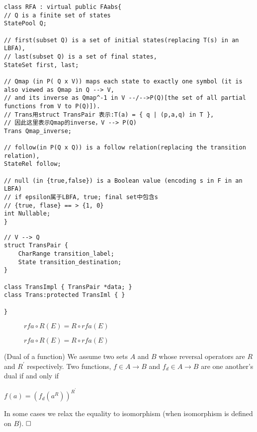 \begin{lstlisting}
class RFA : virtual public FAabs{
// Q is a finite set of states
StatePool Q;  
  
// first(subset Q) is a set of initial states(replacing T(s) in an LBFA),
// last(subset Q) is a set of final states,
StateSet first, last;

// Qmap (in P( Q x V)) maps each state to exactly one symbol (it is also viewed as Qmap in Q --> V, 
// and its inverse as Qmap^-1 in V --/-->P(Q)[the set of all partial functions from V to P(Q)]).
// Trans用struct TransPair 表示:T(a) = { q | (p,a,q) in T },
// 因此这里表示Qmap的inverse，V --> P(Q)
Trans Qmap_inverse;

// follow(in P(Q x Q)) is a follow relation(replacing the transition relation),
StateRel follow;

// null (in {true,false}) is a Boolean value (encoding s in F in an LBFA)
// if epsilon属于LBFA, true; final set中包含s
// {true, flase} == > {1, 0}
int Nullable;
}
\end{lstlisting}

\begin{lstlisting}
// V --> Q
struct TransPair {
	CharRange transition_label;
	State transition_destination;
}

class TransImpl { TransPair *data; }
class Trans:protected TransIml { }

}
\end{lstlisting}


\begin{figure}[htbp] 
$rfa\circ R(E) = R\circ rfa(E)$\\
\caption{$rfa\circ R(E) = R\circ rfa(E)$}
\end{figure}

\begin{definition} (Dual of a function) 
We assume two sets $A$ and $B$ whose reversal operators are $R$ and $R^\prime$ respectively. Two functions, $f\in A\to B$ and $f_d \in A\to B$ are one another's dual if and only if

$f(a)=(f_d(a^R))^{R^\prime}$

In some cases we relax the equality to isomorphism (when isomorphism is defined on $B$). $\hfill\square$
\end{definition}

